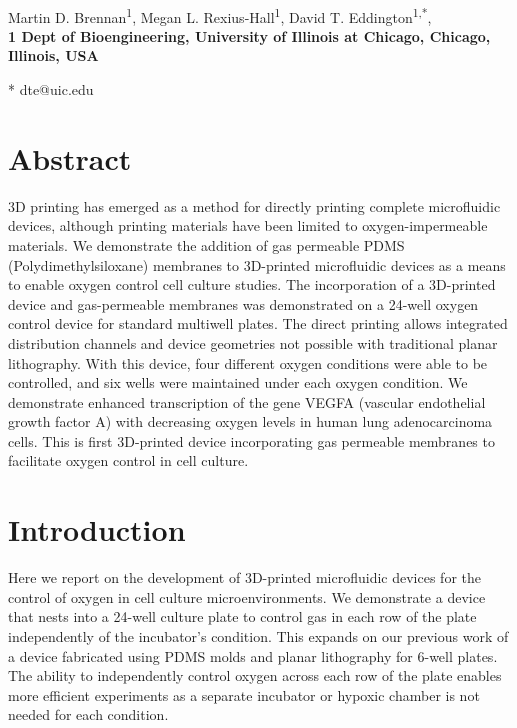\documentclass[10pt,letterpaper]{article}
\date{}
\begin{document}
\vspace*{0.35in}

\begin{flushleft}
{\Large
\textbf{}
}
\newline
\\
Martin D. Brennan\textsuperscript{1},
Megan L. Rexius-Hall\textsuperscript{1},
David T. Eddington\textsuperscript{1,*},
\\
\bigskip
\bf{1} Dept of Bioengineering, University of Illinois at Chicago, Chicago, Illinois, USA
\\
\bigskip

* dte@uic.edu

\end{flushleft}
\section*{Abstract}
3D printing has emerged as a method for directly printing complete microfluidic devices, although printing materials have been limited to oxygen-impermeable materials.
We demonstrate the addition of gas permeable PDMS (Polydimethylsiloxane) membranes to 3D-printed microfluidic devices as a means to enable oxygen control cell culture studies.
The incorporation of a 3D-printed device and gas-permeable membranes was demonstrated on a 24-well oxygen control device for standard multiwell plates.
The direct printing allows integrated distribution channels and device geometries not possible with traditional planar lithography.
With this device, four different oxygen conditions were able to be controlled, and six wells were maintained under each oxygen condition. 
We demonstrate enhanced transcription of the gene VEGFA (vascular endothelial growth factor A) with decreasing oxygen levels in human lung adenocarcinoma cells.
This is first 3D-printed device incorporating gas permeable membranes to facilitate oxygen control in cell culture.
\linenumbers

\section*{Introduction}
Here we report on the development of 3D-printed microfluidic devices for the control of oxygen in cell culture microenvironments.
We demonstrate a device that nests into a 24-well culture plate to control gas in each row of the plate independently of the incubator's condition.
This expands on our previous work of a device fabricated using PDMS molds and planar lithography for 6-well plates\cite{Oppegard2009,Oppegard2010}.
The ability to independently control oxygen across each row of the plate enables more efficient experiments as a separate incubator or hypoxic chamber is not needed for each condition.
\end{document}
